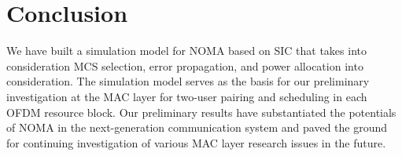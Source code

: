 \section{Conclusion}
\label{sec_conclusion}
We have built a simulation model for NOMA based on SIC that
takes into consideration MCS selection, error propagation, and
power allocation into consideration.
The simulation model serves as the basis for our preliminary
investigation at the MAC layer for two-user pairing and scheduling
in each OFDM resource block.
Our preliminary results have substantiated the potentials of NOMA
in the next-generation communication system and paved the
ground for continuing investigation of various MAC layer research
issues in the future.

